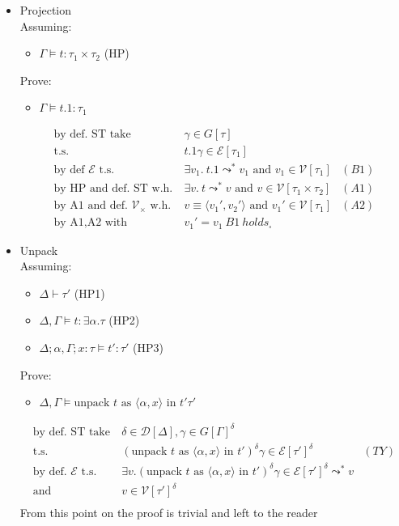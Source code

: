 \documentclass{article}
\newcommand{\pair}[1]{\ensuremath{\langle#1\rangle}}
\newcommand{\V}{\ensuremath{\mathcal{V}}}
\newcommand{\cE}{\ensuremath{\mathcal{E}}}
\newcommand{\cD}{\ensuremath{\mathcal{D}}}
\newcommand{\AND}[0]{\ensuremath {\text{ and }}}
\newcommand{\unpack}[3]{\ensuremath{\text{unpack } #1 \text{ as }\langle #2 \rangle\text{ in }#3}}
\begin{document}
\begin{itemize}
    \item Projection \\
        Assuming: \begin{itemize}
            \item $\Gamma \vDash t:\tau_1\times\tau_2$ (HP)
        \end{itemize}
        Prove: \begin{itemize}
            \item $\Gamma \vDash t.1:\tau_1$
        \end{itemize}
        \begin{align*}
            \text{by def. ST take} &\ \gamma\in G[\tau] \\
            \text{t.s.} &\ t.1\gamma \in \cE[\tau_1] \\
            \text{by def $\cE$ t.s.} &\ \exists v_1.\ t.1\leadsto^{*} v_1\AND v_1\in\V[\tau_1] & (B1) \\
            \text{by HP and def. ST w.h.} &\ \exists v.\ t\leadsto^{*} v\AND v\in\V[\tau_1\times\tau_2] & (A1) \\
            \text{by A1 and def. $\V_\times$ w.h.} &\ v\equiv \pair{v_1',v_2'} \AND v_1' \in \V[\tau_1] & (A2) \\
            \text{by A1,A2 with} &\ v_1'=v_1\ B1\ holds_\square
        \end{align*}

    \item Unpack \\
        Assuming: \begin{itemize}
            \item $\Delta \vdash \tau'$ (HP1)
            \item $\Delta,\Gamma \vDash t:\exists\alpha.\tau$ (HP2)
            \item $\Delta;\alpha,\Gamma;x : \tau\vDash t':\tau'$ (HP3)
        \end{itemize}
        Prove: \begin{itemize}
            \item $\Delta,\Gamma\vDash \unpack{t}{\alpha,x}{t'} \tau'$
        \end{itemize}
        \begin{align*}
            \text{by  def. ST take} &\ \delta\in\cD[\Delta],\gamma\in G[\Gamma]^\delta \\
            \text{t.s.} &\ (\unpack{t}{\alpha,x}{t'})^\delta\gamma\in\cE[\tau']^\delta & (TY) \\
            \text{by def. $\cE$ t.s.} &\ \exists v.(\unpack{t}{\alpha,x}{t'})^\delta\gamma\in\cE[\tau']^\delta \leadsto^{*} v \\
            \text{and}                &\ v\in\V[\tau']^\delta \\
        \end{align*}
        From this point on the proof is trivial and left to the reader
\end{itemize}
\end{document}
